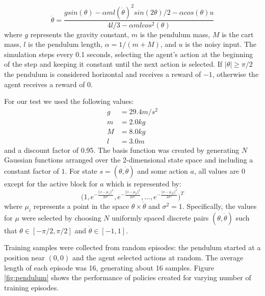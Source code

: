 \begin{equation}
    \ddot{\theta} = \frac{g sin(\theta) - \alpha ml(\dot{\theta})^2 sin(2\theta)/2 - \alpha cos(\theta)u}{4l/3 - \alpha ml cos^2(\theta)}
\label{eq:pendulum}
\end{equation}
where $g$ represents the gravity constant, $m$ is the pendulum mass, $M$ is the cart mass, $l$ is the pendulum length, $\alpha = 1/(m + M)$, and $u$ is the noisy input. The simulation steps every 0.1 seconds, selecting the agent's action at the beginning of the step and keeping it constant until the next action is selected. If $|\theta| \geq \pi/2$ the pendulum is considered horizontal and receives a reward of $-1$, otherwise the agent receives a reward of 0.

For our test we used the following values:
\[
    \begin{aligned}
        g &= 29.4 m/s^2 \\
        m &= 2.0 kg \\
        M &= 8.0 kg \\
        l &= 3.0 m
    \end{aligned}
\]
and a discount factor of 0.95. The basis function was created by generating $N$ Gaussian functions arranged over the 2-dimensional state space and including a constant factor of $1$. For state $s = (\theta,\dot{\theta})$ and some action $a$, all values are $0$ except for the active block for $a$ which is represented by:
\[
    \big(1, e^{-\frac{||s - \mu_1||^2}{2\sigma^2}}, e^{-\frac{||s - \mu_2||^2}{2\sigma^2}}, \dots, e^{-\frac{||s - \mu_N||^2}{2\sigma^2}}\big)^T
\]
where $\mu_i$ represents a point in the space $\theta \times \dot{\theta}$ and $\sigma^2 = 1$. Specifically, the values for $\mu$ were selected by choosing $N$ uniformly spaced discrete pairs $(\theta, \dot{\theta})$ such that $\theta \in [-\pi/2, \pi/2]$ and $\dot{\theta} \in [-1, 1]$. 

Training samples were collected from random episodes: the pendulum started at a position near $(0,0)$ and the agent selected actions at random. The average length of each episode was 16, generating about 16 samples. Figure \ref{fig:pendulum} shows the performance of policies created for varying number of training episodes.

